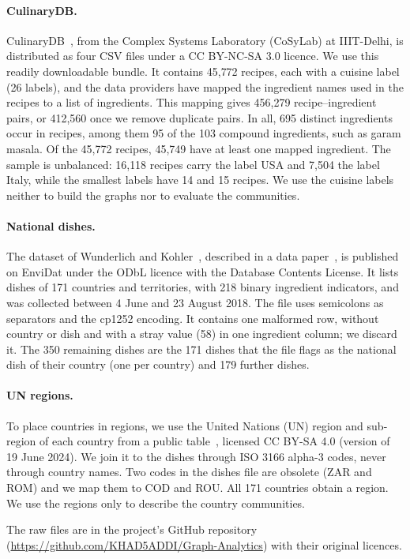 \paragraph{CulinaryDB.}
CulinaryDB~\cite{culinarydb}, from the Complex Systems Laboratory (CoSyLab)
at IIIT-Delhi, is distributed as four CSV files under a CC BY-NC-SA 3.0
licence. We use this readily downloadable bundle. It contains 45{,}772
recipes, each with a cuisine label (26 labels), and the data providers have
mapped the ingredient names used in the recipes to a list of ingredients. This
mapping gives 456{,}279 recipe--ingredient pairs, or 412{,}560 once we remove
duplicate pairs. In all, 695 distinct ingredients occur in recipes, among them
95 of the 103 compound ingredients, such as garam masala. Of the 45{,}772
recipes, 45{,}749 have at least one mapped ingredient. The sample is
unbalanced: 16{,}118 recipes carry the label USA and 7{,}504 the label Italy,
while the smallest labels have 14 and 15 recipes. We use the cuisine labels
neither to build the graphs nor to evaluate the communities.

\paragraph{National dishes.}
The dataset of Wunderlich and Kohler~\cite{wunderlich2022data}, described in
a data paper~\cite{wunderlich2022paper}, is published on EnviDat under the
ODbL licence with the Database Contents License. It lists dishes of 171
countries and territories, with 218 binary ingredient indicators, and was
collected between 4 June and 23 August 2018. The file uses semicolons as
separators and the cp1252 encoding. It contains one malformed row, without
country or dish and with a stray value (58) in one ingredient column; we
discard it. The 350 remaining dishes are the 171 dishes that the file flags as
the national dish of their country (one per country) and 179 further dishes.

\paragraph{UN regions.}
To place countries in regions, we use the United Nations (UN) region and
sub-region of each country from a public table~\cite{unregions}, licensed
CC BY-SA 4.0 (version of 19 June 2024). We join it to the dishes through
ISO 3166 alpha-3 codes, never through country names. Two codes in the dishes
file are obsolete (ZAR and ROM) and we map them to COD and ROU. All 171
countries obtain a region. We use the regions only to describe the country
communities.

The raw files are in the project's GitHub repository
(\url{https://github.com/KHAD5ADDI/Graph-Analytics}) with their original
licences.
